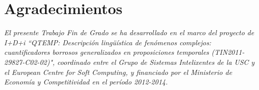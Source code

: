\chapter*{Agradecimientos}

\thispagestyle{empty}

\textit{El presente Trabajo Fin de Grado se ha desarrollado en el marco del proyecto de I+D+i ``QTEMP: Descripción lingüística de fenómenos complejos: cuantificadores borrosos generalizados en proposiciones temporales (TIN2011-29827-C02-02)", coordinado entre el Grupo de Sistemas Intelixentes de la USC y el European Centre for Soft Computing, y financiado por el Ministerio de Economía y Competitividad en el período 2012-2014.}